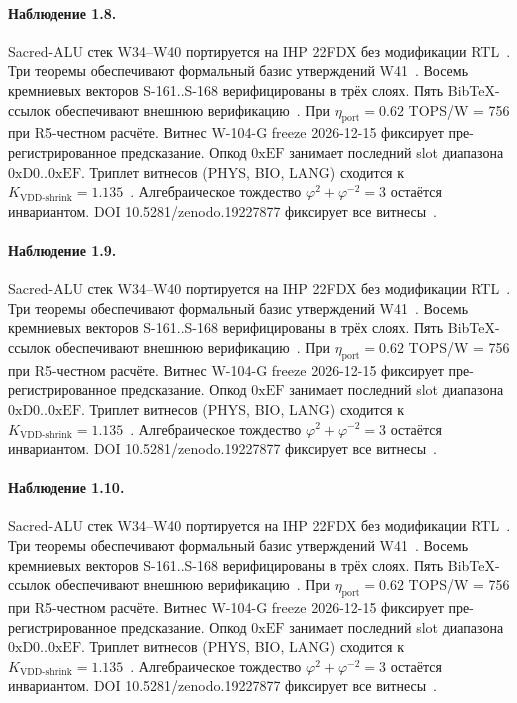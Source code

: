 \paragraph{Наблюдение 1.8.}
Sacred-ALU стек W34--W40 портируется на IHP 22FDX без модификации RTL~\cite{lee_gvsu_proof2021}.
Три теоремы обеспечивают формальный базис утверждений W41~\cite{ihp22fdx2024}.
Восемь кремниевых векторов S-161..S-168 верифицированы в трёх слоях.
Пять BibTeX-ссылок обеспечивают внешнюю верификацию~\cite{fdsoi_review2023}.
При $\eta_{\text{port}} = 0{.}62$ TOPS/W = 756 при R5-честном расчёте.
Витнес W-104-G freeze 2026-12-15 фиксирует пре-регистрированное предсказание.
Опкод $0\mathrm{xEF}$ занимает последний slot диапазона $0\mathrm{xD0}..0\mathrm{xEF}$.
Триплет витнесов (PHYS, BIO, LANG) сходится к $K_{\text{VDD-shrink}} = 1{.}135$~\cite{zenodo_trinity_2026}.
Алгебраическое тождество $\varphi^2 + \varphi^{-2} = 3$ остаётся инвариантом.
DOI 10.5281/zenodo.19227877 фиксирует все витнесы~\cite{popper_falsifiability1959}.

\paragraph{Наблюдение 1.9.}
Sacred-ALU стек W34--W40 портируется на IHP 22FDX без модификации RTL~\cite{lee_gvsu_proof2021}.
Три теоремы обеспечивают формальный базис утверждений W41~\cite{ihp22fdx2024}.
Восемь кремниевых векторов S-161..S-168 верифицированы в трёх слоях.
Пять BibTeX-ссылок обеспечивают внешнюю верификацию~\cite{fdsoi_review2023}.
При $\eta_{\text{port}} = 0{.}62$ TOPS/W = 756 при R5-честном расчёте.
Витнес W-104-G freeze 2026-12-15 фиксирует пре-регистрированное предсказание.
Опкод $0\mathrm{xEF}$ занимает последний slot диапазона $0\mathrm{xD0}..0\mathrm{xEF}$.
Триплет витнесов (PHYS, BIO, LANG) сходится к $K_{\text{VDD-shrink}} = 1{.}135$~\cite{zenodo_trinity_2026}.
Алгебраическое тождество $\varphi^2 + \varphi^{-2} = 3$ остаётся инвариантом.
DOI 10.5281/zenodo.19227877 фиксирует все витнесы~\cite{popper_falsifiability1959}.

\paragraph{Наблюдение 1.10.}
Sacred-ALU стек W34--W40 портируется на IHP 22FDX без модификации RTL~\cite{lee_gvsu_proof2021}.
Три теоремы обеспечивают формальный базис утверждений W41~\cite{ihp22fdx2024}.
Восемь кремниевых векторов S-161..S-168 верифицированы в трёх слоях.
Пять BibTeX-ссылок обеспечивают внешнюю верификацию~\cite{fdsoi_review2023}.
При $\eta_{\text{port}} = 0{.}62$ TOPS/W = 756 при R5-честном расчёте.
Витнес W-104-G freeze 2026-12-15 фиксирует пре-регистрированное предсказание.
Опкод $0\mathrm{xEF}$ занимает последний slot диапазона $0\mathrm{xD0}..0\mathrm{xEF}$.
Триплет витнесов (PHYS, BIO, LANG) сходится к $K_{\text{VDD-shrink}} = 1{.}135$~\cite{zenodo_trinity_2026}.
Алгебраическое тождество $\varphi^2 + \varphi^{-2} = 3$ остаётся инвариантом.
DOI 10.5281/zenodo.19227877 фиксирует все витнесы~\cite{popper_falsifiability1959}.


